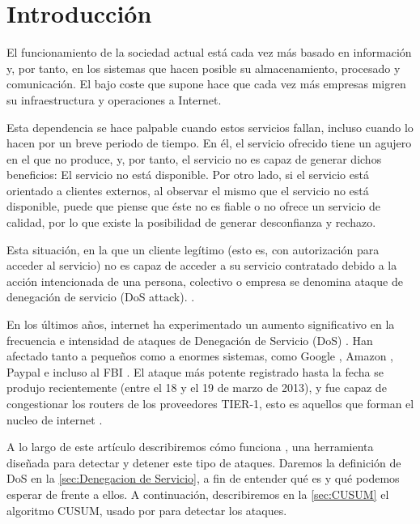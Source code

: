 \section{Introducción}\label{introduccion}
El funcionamiento de la sociedad actual está cada vez más basado en 
información y, por tanto, en los sistemas que hacen posible su almacenamiento, procesado y comunicación. El bajo coste 
que supone hace que cada vez más empresas migren su infraestructura y operaciones a Internet.

Esta dependencia se hace palpable cuando estos servicios fallan, incluso cuando lo hacen por un breve periodo de tiempo. 
En él, el servicio ofrecido tiene un agujero en el que no produce, y, por tanto, el servicio no es capaz de generar 
dichos beneficios: El servicio no está disponible. Por otro lado, si el servicio está orientado a clientes externos, al 
observar el mismo que el servicio no está disponible, puede que piense que éste no es fiable o no ofrece un servicio 
de calidad, por lo que existe la posibilidad de generar desconfianza y rechazo.

Esta situación, en la que un cliente legítimo (esto es, con autorización para acceder al servicio) no es capaz de 
acceder a su servicio contratado debido a la acción intencionada de una persona, colectivo o empresa se denomina ataque 
de denegación de servicio (DoS attack). \cite{Raghavan}.

En los últimos años, internet ha experimentado un aumento significativo en la frecuencia e intensidad de ataques de 
Denegación de Servicio (DoS) \cite{kakaspersky_2H2011_DDoS_analisis}. Han afectado tanto a pequeños como a enormes 
sistemas, como Google \cite{Google+_DDoS_attack}, Amazon \cite{Amazon_DDoS_attack}, Paypal e incluso al FBI 
\cite{FBI_DDoS_attack}. El ataque más potente registrado hasta la fecha se produjo recientemente (entre el 18 y el 19 de 
marzo de 2013), y fue capaz de congestionar los routers de los proveedores TIER-1, esto es aquellos que
forman el nucleo de internet \cite{spamhaus_DDoS_attack}. 

A lo largo de este artículo describiremos cómo funciona \redborderddos, una herramienta diseñada 
para detectar y detener este tipo de ataques. Daremos la
definición de \gls{DoS} en la \autoref{sec:Denegacion de Servicio},
a fin de entender qué es y qué podemos esperar de \redborderddos{}
frente a ellos. A continuación, describiremos en la 
\autoref{sec:CUSUM} el algoritmo
CUSUM, usado por \redborderddos{} para detectar los ataques.

